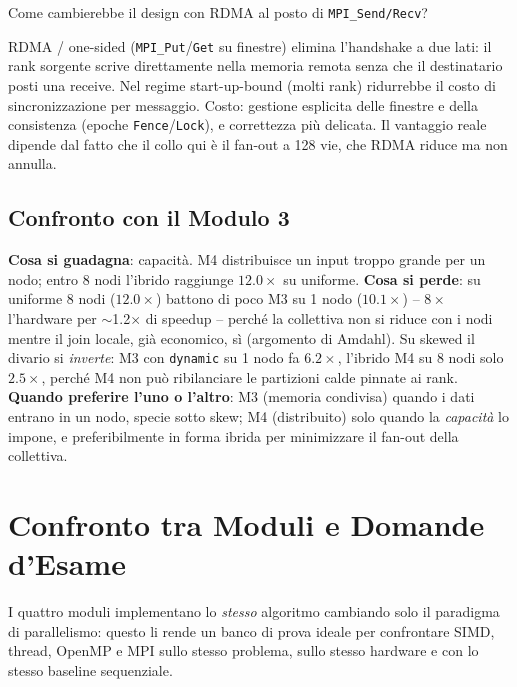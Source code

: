 \documentclass[11pt,a4paper]{article}
\theoremstyle{remark}
\newenvironment{esercizio}[1][]{%
  \begin{tcolorbox}[breakable,title={\textbf{Esercizio / Domanda d'esame}\ifx&#1&\else: #1\fi},
    colback=yellow!5!white, colframe=orange!75!black, fonttitle=\small\bfseries]%
}{%
  \end{tcolorbox}%
}
\newenvironment{risposta}{%
  \begin{tcolorbox}[breakable,title={\textbf{Risposta}},
    colback=green!5!white, colframe=green!50!black, fonttitle=\small\bfseries]%
}{%
  \end{tcolorbox}%
}
\begin{document}
\begin{esercizio}[M4 -- RDMA]
Come cambierebbe il design con RDMA al posto di \texttt{MPI\_Send/Recv}?
\end{esercizio}
\begin{risposta}
RDMA / one-sided (\texttt{MPI\_Put}/\texttt{Get} su finestre) elimina l'handshake a due lati: il rank sorgente scrive direttamente nella memoria remota senza che il destinatario posti una receive. Nel regime start-up-bound (molti rank) ridurrebbe il costo di sincronizzazione per messaggio. Costo: gestione esplicita delle finestre e della consistenza (epoche \texttt{Fence}/\texttt{Lock}), e correttezza pi\`u delicata. Il vantaggio reale dipende dal fatto che il collo qui \`e il fan-out a 128 vie, che RDMA riduce ma non annulla.
\end{risposta}

\subsection{Confronto con il Modulo 3}

\textbf{Cosa si guadagna}: capacit\`a. M4 distribuisce un input troppo grande per un nodo; entro 8 nodi l'ibrido raggiunge $12.0\times$ su uniforme. \textbf{Cosa si perde}: su uniforme 8 nodi ($12.0\times$) battono di poco M3 su 1 nodo ($10.1\times$) -- $8\times$ l'hardware per $\sim$1.2$\times$ di speedup -- perch\'e la collettiva non si riduce con i nodi mentre il join locale, gi\`a economico, s\`i (argomento di Amdahl). Su skewed il divario si \emph{inverte}: M3 con \texttt{dynamic} su 1 nodo fa $6.2\times$, l'ibrido M4 su 8 nodi solo $2.5\times$, perch\'e M4 non pu\`o ribilanciare le partizioni calde pinnate ai rank. \textbf{Quando preferire l'uno o l'altro}: M3 (memoria condivisa) quando i dati entrano in un nodo, specie sotto skew; M4 (distribuito) solo quando la \emph{capacit\`a} lo impone, e preferibilmente in forma ibrida per minimizzare il fan-out della collettiva.


\section{Confronto tra Moduli e Domande d'Esame}
\label{sec:confronto-moduli}

I quattro moduli implementano lo \emph{stesso} algoritmo cambiando solo il paradigma di parallelismo: questo li rende un banco di prova ideale per confrontare SIMD, thread, OpenMP e MPI sullo stesso problema, sullo stesso hardware e con lo stesso baseline sequenziale.
\end{document}
